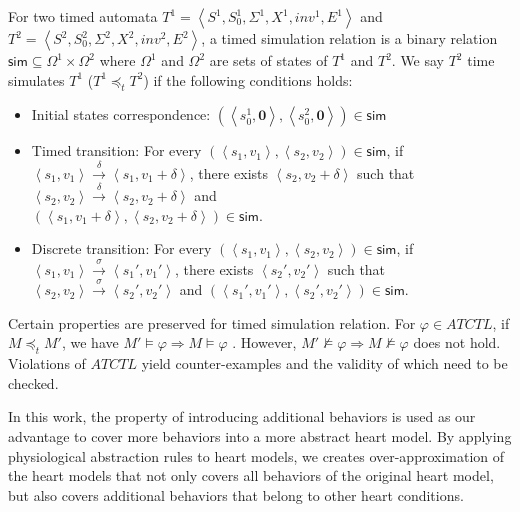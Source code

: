 For two timed automata $T^1=\left\langle S^1,S_0^1,\Sigma^1,X^1,inv^1,E^1\right\rangle$ and $T^2=\left\langle S^2,S_0^2,\Sigma^2,X^2,inv^2,E^2\right\rangle$, a timed simulation relation is a binary relation $\textsf{sim}\subseteq \Omega^1\times \Omega^2$ where $\Omega^1$ and $\Omega^2$ are sets of states of $T^1$ and $T^2$. We say $T^2$ \textsf{time simulates} $T^1$ ($T^1 \preceq_t T^2$) if the following conditions holds:
\begin{itemize}
	\item Initial states correspondence: $(\left\langle s_0^1,\textbf{0}\right\rangle,\left\langle s_0^2,\textbf{0}\right\rangle)\in \textsf{sim}$
	\item Timed transition: For every $(\left\langle s_1,v_1\right\rangle,\left\langle s_2,v_2\right\rangle)\in\textsf{sim}$, if $\left\langle s_1,v_1\right\rangle\xrightarrow{\delta}\left\langle s_1,v_1+\delta\right\rangle$, there exists $\left\langle s_2,v_2+\delta\right\rangle$ such that $\left\langle s_2,v_2\right\rangle\xrightarrow{\delta}\left\langle s_2,v_2+\delta\right\rangle$ and \\$(\left\langle s_1,v_1+\delta\right\rangle,\left\langle s_2,v_2+\delta\right\rangle)\in\textsf{sim}$.
	\item Discrete transition: For every $(\left\langle s_1,v_1\right\rangle,\left\langle s_2,v_2\right\rangle)\in\textsf{sim}$, if $\left\langle s_1,v_1\right\rangle\xrightarrow{\sigma}\left\langle s_1',v_1'\right\rangle$, there exists $\left\langle s_2',v_2'\right\rangle$ such that $\left\langle s_2,v_2\right\rangle\xrightarrow{\sigma}\left\langle s_2',v_2'\right\rangle$ and $(\left\langle s_1',v_1'\right\rangle,\left\langle s_2',v_2'\right\rangle)\in\textsf{sim}$.
\end{itemize}

Certain properties are preserved for timed simulation relation. 
For $\varphi\in ATCTL$, if $M\preceq_t M'$, we have $M'\models \varphi\Rightarrow M\models\varphi$ \cite{simulation}. 
However, $M'\not\models \varphi\Rightarrow M\not\models\varphi$ does not hold. 
Violations of $ATCTL$ yield \textsf{counter-examples} and the validity of which need to be checked.

In this work, the property of introducing additional behaviors is used as our advantage to cover more behaviors into a more abstract heart model.
By applying physiological abstraction rules to heart models, we creates over-approximation of the heart models that not only covers all behaviors of the original heart model, but also covers additional behaviors that belong to other heart conditions.

